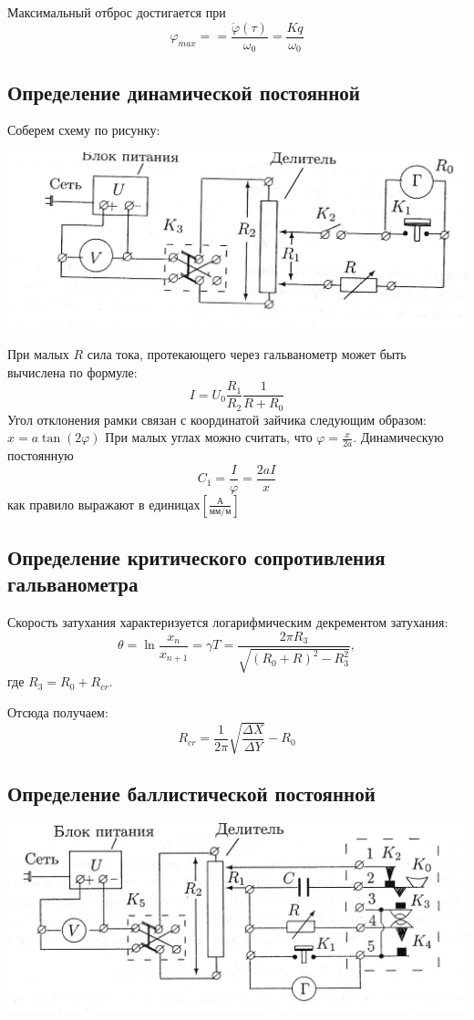 \documentclass[a4paper,12pt]{article}
\begin{document}
		Максимальный отброс достигается при \begin{equation}
			\varphi_{max} =  =\frac{ \dot{\varphi}(\tau)}{\omega_0} = \frac{Kq}{\omega_0}
		\end{equation}
		\subsection{Определение динамической постоянной}
		Соберем схему по рисунку:
		\newline
		
		\includegraphics[width = 0.7\linewidth]{pic1}
		
		
		При малых $R$ сила тока, протекающего через гальванометр может быть вычислена по формуле:
		\begin{equation}
		I = U_0 \frac{R_1}{R_2}\frac{1}{R+R_0}
		\end{equation}
		Угол отклонения рамки связан с координатой зайчика следующим образом: $x = a\tan(2\varphi)$ При малых углах можно считать, что $\varphi = \frac{x}{2a}$. Динамическую постоянную 
		\begin{equation}
			C_1 = \frac{I}{\varphi} = \frac{2aI}{x}
		\end{equation}
		как правило выражают в единицах$ \left[\frac{\text{А}}{\text{мм} / \text{м}}\right]$
		\subsection{Определение критического сопротивления гальванометра}
		Скорость затухания характеризуется логарифмическим декрементом затухания:
		\begin{equation}
			\theta  = \ln\frac{x_n}{x_{n+1}} = \gamma T = \frac{2\pi R_3}{\sqrt{\left(R_0+R\right)^2-R_3^2}},
		\end{equation} 
		где $R_3 = R_0 + R_{cr}$.
		
		Отсюда получаем:
		\begin{equation}
		R_{cr} = \frac{1}{2\pi}\sqrt{\frac{\Delta X}{\Delta Y}}-R_0
		\end{equation}
	\subsection{Определение баллистической постоянной}
	\includegraphics[width = 0.7\linewidth]{pic2}
	
\end{document}
